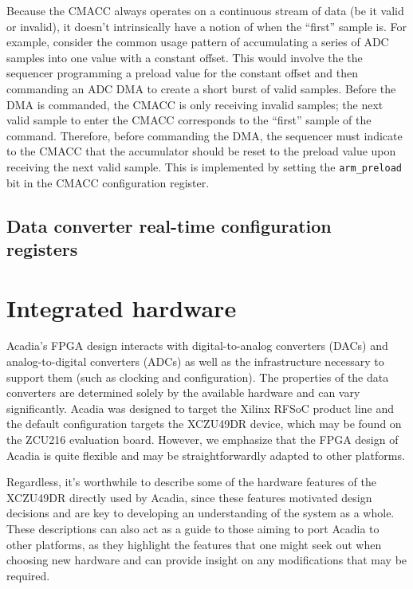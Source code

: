 Because the CMACC always operates on a continuous stream of data (be it valid or invalid), it doesn't intrinsically have a notion of when the ``first'' sample is. For example, consider the common usage pattern of accumulating a series of ADC samples into one value with a constant offset. This would involve the the sequencer programming a preload value for the constant offset and then commanding an ADC DMA to create a short burst of valid samples. Before the DMA is commanded, the CMACC is only receiving invalid samples; the next valid sample to enter the CMACC corresponds to the ``first'' sample of the command. Therefore, before commanding the DMA, the sequencer must indicate to the CMACC that the accumulator should be reset to the preload value upon receiving the next valid sample. This is implemented by setting the \lstinline|arm_preload| bit in the CMACC configuration register.




\subsection{Data converter real-time configuration registers}

\section{Integrated hardware}

Acadia's FPGA design interacts with digital-to-analog converters (DACs) and analog-to-digital converters (ADCs) as well as the infrastructure necessary to support them (such as clocking and configuration). The properties of the data converters are determined solely by the available hardware and can vary significantly. Acadia was designed to target the Xilinx RFSoC product line and the default configuration targets the XCZU49DR device, which may be found on the ZCU216 evaluation board. However, we emphasize that the FPGA design of Acadia is quite flexible and may be straightforwardly adapted to other platforms. 

Regardless, it's worthwhile to describe some of the hardware features of the XCZU49DR directly used by Acadia, since these features motivated design decisions and are key to developing an understanding of the system as a whole. These descriptions can also act as a guide to those aiming to port Acadia to other platforms, as they highlight the features that one might seek out when choosing new hardware and can provide insight on any modifications that may be required.

